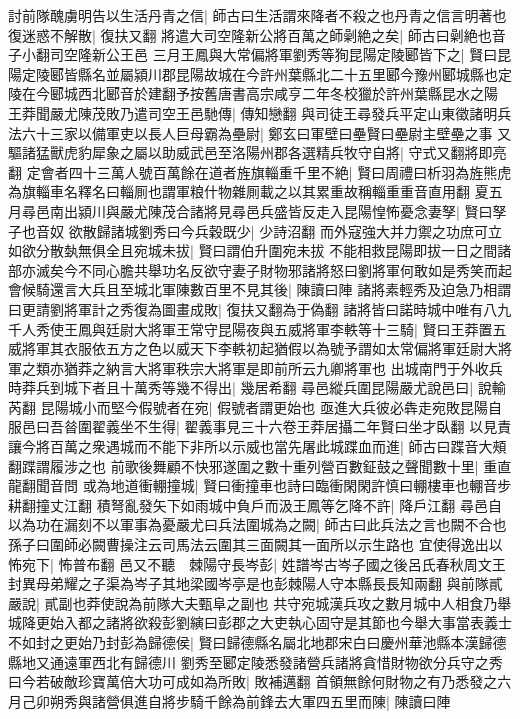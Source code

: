 討前隊醜虜明告以生活丹青之信|{
	師古曰生活謂來降者不殺之也丹青之信言明著也}
復迷惑不解散|{
	復扶又翻}
將遣大司空隆新公將百萬之師劋絶之矣|{
	師古曰劋絶也音子小翻司空隆新公王邑}
三月王鳳與大常偏將軍劉秀等狥昆陽定陵郾皆下之|{
	賢曰昆陽定陵郾皆縣名並屬潁川郡昆陽故城在今許州葉縣北二十五里郾今豫州郾城縣也定陵在今郾城西北郾音於建翻予按舊唐書高宗咸亨二年冬校獵於許州葉縣昆水之陽}
王莽聞嚴尤陳茂敗乃遣司空王邑馳傳|{
	傳知戀翻}
與司徒王尋發兵平定山東徵諸明兵法六十三家以備軍吏以長人巨母霸為壘尉|{
	鄭玄曰軍壁曰壘賢曰壘尉主壁壘之事}
又驅諸猛獸虎豹犀象之屬以助威武邑至洛陽州郡各選精兵牧守自將|{
	守式又翻將即亮翻}
定會者四十三萬人號百萬餘在道者旌旗輜重千里不絶|{
	賢曰周禮曰析羽為旌熊虎為旗輜車名釋名曰輜厠也謂軍粮什物雜厠載之以其累重故稱輜重重音直用翻}
夏五月尋邑南出潁川與嚴尤陳茂合諸將見尋邑兵盛皆反走入昆陽惶怖憂念妻孥|{
	賢曰孥子也音奴}
欲散歸諸城劉秀曰今兵穀既少|{
	少詩沼翻}
而外寇強大并力禦之功庶可立如欲分散埶無俱全且宛城未拔|{
	賢曰謂伯升圍宛未拔}
不能相救昆陽即拔一日之間諸部亦滅矣今不同心膽共舉功名反欲守妻子財物邪諸將怒曰劉將軍何敢如是秀笑而起會候騎還言大兵且至城北軍陳數百里不見其後|{
	陳讀曰陣}
諸將素輕秀及迫急乃相謂曰更請劉將軍計之秀復為圖畫成敗|{
	復扶又翻為于偽翻}
諸將皆曰諾時城中唯有八九千人秀使王鳳與廷尉大將軍王常守昆陽夜與五威將軍李軼等十三騎|{
	賢曰王莽置五威將軍其衣服依五方之色以威天下李軼初起猶假以為號予謂如太常偏將軍廷尉大將軍之類亦猶莽之納言大將軍秩宗大將軍是即前所云九卿將軍也}
出城南門于外收兵時莽兵到城下者且十萬秀等幾不得出|{
	幾居希翻}
尋邑縱兵圍昆陽嚴尤說邑曰|{
	說輸芮翻}
昆陽城小而堅今假號者在宛|{
	假號者謂更始也}
亟進大兵彼必犇走宛敗昆陽自服邑曰吾㫺圍翟義坐不生得|{
	翟義事見三十六卷王莽居攝二年賢曰坐才臥翻}
以見責讓今將百萬之衆遇城而不能下非所以示威也當先屠此城蹀血而進|{
	師古曰蹀音大頰翻蹀謂履涉之也}
前歌後舞顧不快邪遂圍之數十重列營百數鉦鼓之聲聞數十里|{
	重直龍翻聞音問}
或為地道衝輣撞城|{
	賢曰衝撞車也詩曰臨衝閑閑許慎曰輣樓車也輣音步耕翻撞丈江翻}
積弩亂發矢下如雨城中負戶而汲王鳳等乞降不許|{
	降戶江翻}
尋邑自以為功在漏刻不以軍事為憂嚴尤曰兵法圍城為之闕|{
	師古曰此兵法之言也闕不合也孫子曰圍師必闕曹操注云司馬法云圍其三面闕其一面所以示生路也}
宜使得逸出以怖宛下|{
	怖普布翻}
邑又不聽　棘陽守長岑彭|{
	姓譜岑古岑子國之後呂氏春秋周文王封異母弟耀之子渠為岑子其地梁國岑亭是也彭棘陽人守本縣長長知兩翻}
與前隊貳嚴說|{
	貳副也莽使說為前隊大夫甄阜之副也}
共守宛城漢兵攻之數月城中人相食乃舉城降更始入都之諸將欲殺彭劉縯曰彭郡之大吏執心固守是其節也今舉大事當表義士不如封之更始乃封彭為歸德侯|{
	賢曰歸德縣名屬北地郡宋白曰慶州華池縣本漢歸德縣地又通遠軍西北有歸德川}
劉秀至郾定陵悉發諸營兵諸將貪惜財物欲分兵守之秀曰今若破敵珍寶萬倍大功可成如為所敗|{
	敗補邁翻}
首領無餘何財物之有乃悉發之六月己卯朔秀與諸營俱進自將步騎千餘為前鋒去大軍四五里而陳|{
	陳讀曰陣}
